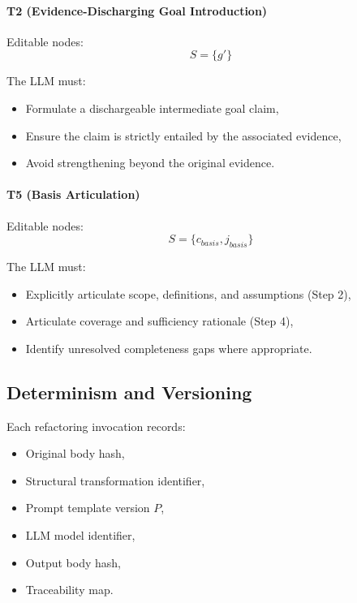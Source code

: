 \documentclass[12pt,twoside,a4paper]{article}
\begin{document}
\paragraph{T2 (Evidence-Discharging Goal Introduction)}

Editable nodes:
\[
S = \{ g' \}
\]

The LLM must:

\begin{itemize}
  \item Formulate a dischargeable intermediate goal claim,
  \item Ensure the claim is strictly entailed by the associated evidence,
  \item Avoid strengthening beyond the original evidence.
\end{itemize}

\paragraph{T5 (Basis Articulation)}

Editable nodes:
\[
S = \{ c_{basis}, j_{basis} \}
\]

The LLM must:

\begin{itemize}
  \item Explicitly articulate scope, definitions, and assumptions (Step 2),
  \item Articulate coverage and sufficiency rationale (Step 4),
  \item Identify unresolved completeness gaps where appropriate.
\end{itemize}

\subsection{Determinism and Versioning}

Each refactoring invocation records:

\begin{itemize}
  \item Original body hash,
  \item Structural transformation identifier,
  \item Prompt template version $P$,
  \item LLM model identifier,
  \item Output body hash,
  \item Traceability map.
\end{itemize}
\end{document}

